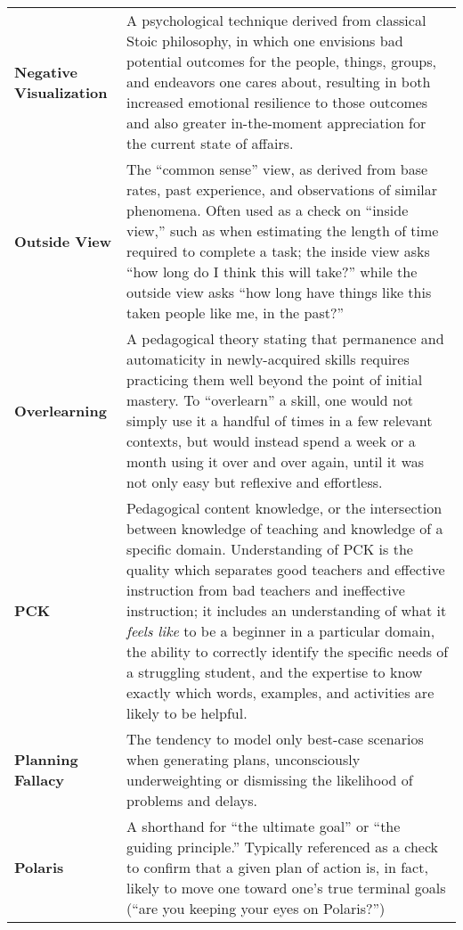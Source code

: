 \begin{longtable} { p{} p{} }
\textbf{Negative Visualization} & A psychological technique derived from classical Stoic philosophy, in which one envisions bad potential outcomes for the people, things, groups, and endeavors one cares about, resulting in both increased emotional resilience to those outcomes and also greater in-the-moment appreciation for the current state of affairs.\\

\textbf{Outside View} & The ``common sense'' view, as derived from base rates, past experience, and observations of similar phenomena.  Often used as a check on ``inside view,'' such as when estimating the length of time required to complete a task; the inside view asks ``how long do I think this will take?'' while the outside view asks ``how long have things like this taken people like me, in the past?''\\

\textbf{Overlearning} & A pedagogical theory stating that permanence and automaticity in newly-acquired skills requires practicing them well beyond the point of initial mastery.  To ``overlearn'' a skill, one would not simply use it a handful of times in a few relevant contexts, but would instead spend a week or a month using it over and over again, until it was not only easy but reflexive and effortless.\\

\textbf{PCK} & Pedagogical content knowledge, or the intersection between knowledge of teaching and knowledge of a specific domain.  Understanding of PCK is the quality which separates good teachers and effective instruction from bad teachers and ineffective instruction; it includes an understanding of what it \emph{feels like} to be a beginner in a particular domain, the ability to correctly identify the specific needs of a struggling student, and the expertise to know exactly which words, examples, and activities are likely to be helpful.\\

\textbf{Planning Fallacy} & The tendency to model only best-case scenarios when generating plans, unconsciously underweighting or dismissing the likelihood of problems and delays.\\

\textbf{Polaris} & A shorthand for ``the ultimate goal'' or ``the guiding principle.''  Typically referenced as a check to confirm that a given plan of action is, in fact, likely to move one toward one's true terminal goals (``are you keeping your eyes on Polaris?'')\\


\end{longtable}

